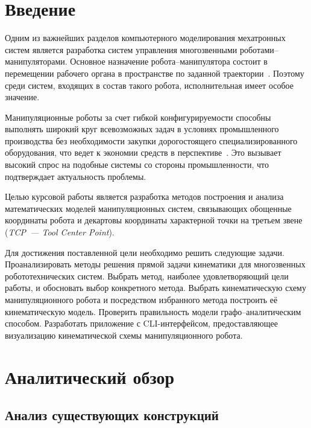 \documentclass[oneside, final, 14pt]{extarticle}
\begin{document}
\newpage
\thispagestyle{empty}
\tableofcontents
\newpage

\section*{Введение}

Одним из важнейших разделов компьютерного моделирования мехатронных систем является разработка систем управления многозвенными роботами--манипуляторами.
Основное назначение робота--манипулятора состоит в перемещении рабочего органа в пространстве по заданной траектории~\cite{krahmalev:mod_rob}.
Поэтому среди систем, входящих в состав такого робота, исполнительная имеет особое значение.
\par
Манипуляционные роботы за счет гибкой конфигурируемости способны выполнять широкий круг всевозможных задач в условиях промышленного производства без необходимости закупки дорогостоящего специализированного оборудования, что ведет к экономии средств в перспективе~\cite{borisov:mod_rob}.
Это вызывает высокий спрос на подобные системы со стороны промышленности, что подтверждает актуальность проблемы.
\par
Целью курсовой работы является разработка методов построения и анализа математических моделей манипуляционных систем, связывающих обощенные координаты робота и декартовы координаты характерной точки на третьем звене ({\itshape TCP~--- Tool Center Point}).
\par
Для достижения поставленной цели необходимо решить следующие задачи.
Проанализировать методы решения прямой задачи кинематики для многозвенных робототехнических систем.
Выбрать метод, наиболее удовлетворяющий цели работы, и обосновать выбор конкретного метода.
Выбрать кинематическую схему манипуляционного робота и посредством избранного метода построить её кинематическую модель.
Проверить правильность модели графо--аналитическим способом.
Разработать приложение с CLI-интерфейсом, предоставляющее визуализацию кинематической схемы манипуляционного робота.

\newpage

\section{Аналитический обзор}

\subsection{Анализ существующих конструкций}
\end{document}
